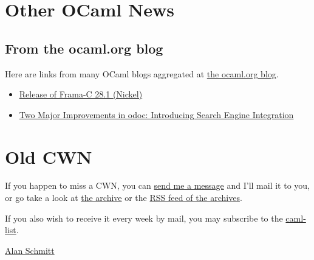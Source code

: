 \documentclass[11pt]{article}
\begin{document}
\section*{Other OCaml News}
\label{16}
\subsection*{From the ocaml.org blog}
\label{sec:org64b0ede}


Here are links from many OCaml blogs aggregated at \href{https://ocaml.org/blog/}{the ocaml.org blog}.

\begin{itemize}
\item \href{https://frama-c.com/fc-versions/nickel.html}{Release of Frama-C 28.1 (Nickel)}
\item \href{https://tarides.com/blog/2024-02-28-two-major-improvements-in-odoc-introducing-search-engine-integration}{Two Major Improvements in odoc: Introducing Search Engine Integration}
\end{itemize}
\section*{Old CWN}
\label{sec:org42fe5a7}
If you happen to miss a CWN, you can \href{mailto:alan.schmitt@polytechnique.org}{send me a message} and I'll mail it to you, or go take a look at \href{https://alan.petitepomme.net/cwn/}{the archive} or the \href{https://alan.petitepomme.net/cwn/cwn.rss}{RSS feed of the archives}.

If you also wish to receive it every week by mail, you may subscribe to the \href{https://sympa.inria.fr/sympa/info/caml-list}{caml-list}.

\begin{authorname}
\href{https://alan.petitepomme.net/}{Alan Schmitt}
\end{authorname}
\end{document}
